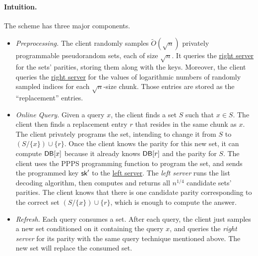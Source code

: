 \paragraph{Intuition.} 
The scheme has three major components.
\begin{itemize}[leftmargin=*]
    \item \textit{Preprocessing.} The client randomly samples $\tilde{O}(\sqrt{n})$ privately programmable pseudorandom sets, each of size $\sqrt{n}$. 
    It queries the \underline{right server} for the sets' parities, storing them along with the keys.
    Moreover, the client queries the \underline{right server} for the values of logarithmic numbers of randomly sampled indices for each $\sqrt{n}$-size chunk.
    Those entries are stored as the ``replacement'' entries.
    
    \item \textit{Online Query.} 
    Given a query $x$, the client finds a set $S$ such that $x\in S$.
    The client then finds a replacement entry $r$ that resides in the same chunk as $x$. 
    The client privately programs the set, intending to change it from $S$ to $(S/\{x\})\cup \{r\}$.
    Once the client knows the parity for this new set, it can compute $\mathsf{DB}[x]$ because it already knows $\mathsf{DB}[r]$ and the parity for $S$.
    The client uses the PPPS programming function to program the set, and sends the programmed key $\mathsf{sk}'$ to the \underline{left server}.
    The \textit{left server} runs the list decoding algorithm, then computes and returns all $n^{1/4}$ candidate sets' parities.
    The client knows that there is one candidate parity corresponding to the correct set $(S/\{x\})\cup \{r\}$, which is enough to compute the answer.
    
    \item \textit{Refresh.} 
    Each query consumes a set. %
    After each query, the client just samples a new set conditioned on it containing the query $x$, and queries the \textit{right server} for its parity with the same query technique mentioned above. 
    The new set will replace the consumed set.
\end{itemize}

